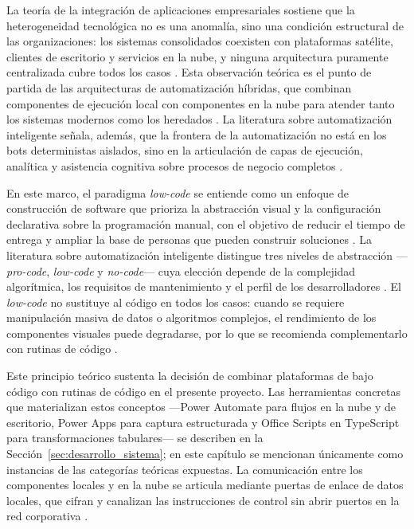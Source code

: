 La teoría de la integración de aplicaciones empresariales sostiene que la heterogeneidad tecnológica no es una anomalía, sino una condición estructural de las organizaciones: los sistemas consolidados coexisten con plataformas satélite, clientes de escritorio y servicios en la nube, y ninguna arquitectura puramente centralizada cubre todos los casos \cite{themistocleous2004eai}. Esta observación teórica es el punto de partida de las arquitecturas de automatización híbridas, que combinan componentes de ejecución local con componentes en la nube para atender tanto los sistemas modernos como los heredados \cite{themistocleous2004eai}. La literatura sobre automatización inteligente señala, además, que la frontera de la automatización no está en los bots deterministas aislados, sino en la articulación de capas de ejecución, analítica y asistencia cognitiva sobre procesos de negocio completos \cite{guida2023ai, konnerth2023ai}.

En este marco, el paradigma \emph{low-code} se entiende como un enfoque de construcción de software que prioriza la abstracción visual y la configuración declarativa sobre la programación manual, con el objetivo de reducir el tiempo de entrega y ampliar la base de personas que pueden construir soluciones \cite{konnerth2023ai}. La literatura sobre automatización inteligente distingue tres niveles de abstracción ---\emph{pro-code}, \emph{low-code} y \emph{no-code}--- cuya elección depende de la complejidad algorítmica, los requisitos de mantenimiento y el perfil de los desarrolladores \cite{konnerth2023ai, guida2023ai}. El \emph{low-code} no sustituye al código en todos los casos: cuando se requiere manipulación masiva de datos o algoritmos complejos, el rendimiento de los componentes visuales puede degradarse, por lo que se recomienda complementarlo con rutinas de código \cite{guida2023ai}.

Este principio teórico sustenta la decisión de combinar plataformas de bajo código con rutinas de código en el presente proyecto. Las herramientas concretas que materializan estos conceptos ---Power Automate para flujos en la nube y de escritorio, Power Apps para captura estructurada y Office Scripts en TypeScript para transformaciones tabulares--- se describen en la Sección~\ref{sec:desarrollo_sistema}; en este capítulo se mencionan únicamente como instancias de las categorías teóricas expuestas. La comunicación entre los componentes locales y en la nube se articula mediante puertas de enlace de datos locales, que cifran y canalizan las instrucciones de control sin abrir puertos en la red corporativa \cite{microsoft2025gateway}.


